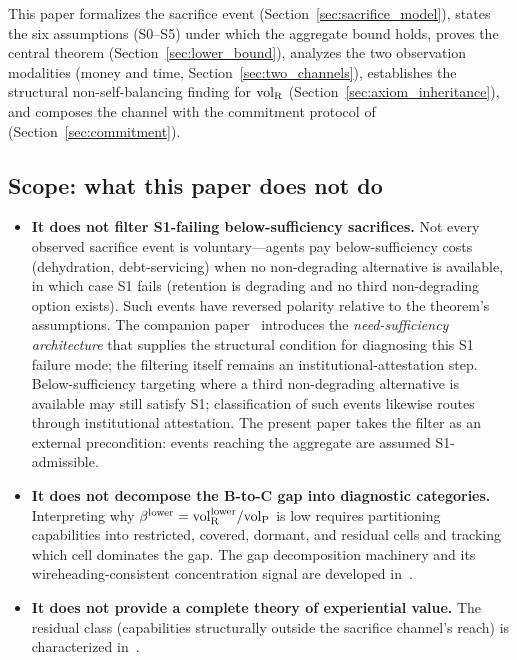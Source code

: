This paper formalizes the sacrifice event
(Section~\ref{sec:sacrifice_model}), states the six assumptions
(S0--S5) under which the aggregate bound holds, proves the
central theorem (Section~\ref{sec:lower_bound}), analyzes the
two observation modalities (money and time,
Section~\ref{sec:two_channels}), establishes the structural
non-self-balancing finding for ${\operatorname{vol}_{\mathrm{R}}}$
(Section~\ref{sec:axiom_inheritance}), and composes the channel
with the commitment protocol
of~\citep[Exogenous~Verification]{lasser2026exo}
(Section~\ref{sec:commitment}).

\subsection{Scope: what this paper does not do}
\label{sec:not_do}

\begin{itemize}
\item
\textbf{It does not filter S1-failing below-sufficiency
sacrifices.}
Not every observed sacrifice event is voluntary---agents pay
below-sufficiency costs (dehydration, debt-servicing) when no
non-degrading alternative is available, in which case S1 fails
(retention is degrading and no third non-degrading option
exists).  Such events have reversed polarity relative to the
theorem's assumptions.  The companion
paper~\citep[Need~Sufficiency]{lasser2026paper8b} introduces the
\emph{need-sufficiency architecture} that supplies the
structural condition for diagnosing this S1 failure mode; the
filtering itself remains an institutional-attestation step.
Below-sufficiency targeting where a third non-degrading
alternative is available may still satisfy S1; classification
of such events likewise routes through institutional
attestation.  The present paper takes the filter as an
external precondition: events reaching the aggregate are
assumed S1-admissible.

\item
\textbf{It does not decompose the B-to-C gap into diagnostic
categories.}  Interpreting why $\beta^{\mathrm{lower}} = {\operatorname{vol}_{\mathrm{R}}^{\mathrm{lower}}}/{\operatorname{vol}_{\mathrm{P}}}$ is
low requires partitioning capabilities into restricted,
covered, dormant, and residual cells and tracking which cell
dominates the gap.  The gap decomposition machinery and its
wireheading-consistent concentration signal are developed
in~\citep[Need~Sufficiency]{lasser2026paper8b}.

\item
\textbf{It does not provide a complete theory of experiential
value.}  The residual class (capabilities structurally outside
the sacrifice channel's reach) is characterized
in~\citep[Need~Sufficiency]{lasser2026paper8b}.


\end{itemize}
